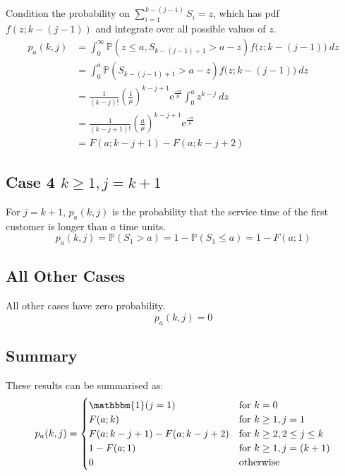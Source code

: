 Condition the probability on $\sum_{i = 1}^{k - (j - 1)} S_{i} = z$, which has pdf $f (z; k - (j - 1))$ and integrate over all possible values of $z$.
\begin{equation}
	\begin{split}
		p_{a} (k, j)
		& = \int_{0}^{\infty} \mathbb{P} (z \leq a, S_{k - (j - 1) + 1} > a - z) f \big( z; k - (j - 1) \big) \ d z \\
		& = \int_{0}^{a} \mathbb{P} (S_{k - (j - 1) + 1} > a - z) f \big( z; k - (j - 1) \big) \ d z \\
		& = \frac{1}{(k - j)!} \left( \frac{1}{\mu} \right)^{k - j + 1} \mathrm{e}^{\frac{- a}{\mu}} \int_{0}^{a} z^{k - j} \ d z \\
		& = \frac{1}{(k - j + 1)!} \left( \frac{a}{\mu} \right)^{k - j + 1} \mathrm{e}^{\frac{- a}{\mu}} \\
		& = F (a; k - j + 1) - F (a; k - j + 2)
	\end{split}
\end{equation}

\subsection{Case 4 $k \geq 1, j = k + 1$}
For $j = k + 1$, $p_{a} (k, j)$ is the probability that the service time of the first customer is longer than $a$ time units.
\begin{equation}
	p_{a} (k, j) = \mathbb{P} (S_{1} > a) = 1 - \mathbb{P} (S_{1} \leq a) = 1 - F (a; 1)
\end{equation}

\subsection{All Other Cases}
All other cases have zero probability.
\begin{equation}
	p_{a} (k, j) = 0
\end{equation}

\subsection{Summary}
These results can be summarised as:
\begin{equation}
	p_{a} (k, j) = \begin{cases}
		\mathbbm{1} (j = 1) & \text{for $k = 0$} \\
		F (a; k) & \text{for $k \geq 1, j = 1$} \\
		F (a; k - j + 1) - F (a; k - j + 2) & \text{for $k \geq 2, 2 \leq j \leq k$} \\
		1 - F (a; 1) & \text{for $k \geq 1, j = (k + 1)$} \\
		0 & \text{otherwise}
	\end{cases}
\end{equation}

